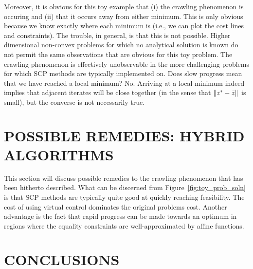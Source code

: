 \documentclass[letterpaper, 10 pt, conference]{ieeeconf}
\begin{document}
Moreover, it is obvious for this toy example that (i) the crawling phenomenon is occuring and (ii) that it occurs away from either minimum. This is only obvious because we know exactly where each minimum is (i.e., we can plot the cost lines and constraints). The trouble, in general, is that this is not possible. Higher dimensional non-convex problems for which no analytical solution is known do not permit the same observations that are obvious for this toy problem. The crawling phenomenon is effectively unobservable in the more challenging problems for which SCP methods are typically implemented on. Does slow progress mean that we have reached a local minimum? No. Arriving at a local minimum indeed implies that adjacent iterates will be close together (in the sense that $\|z^*-\bar{z}\|$ is small), but the converse is not necessarily true. 


\section{POSSIBLE REMEDIES: HYBRID ALGORITHMS}

This section will discuss possible remedies to the crawling phenomenon that has been hitherto described. What can be discerned from Figure~\ref{fig:toy_prob_soln} is that SCP methods are typically quite good at quickly reaching feasibility. The cost of using virtual control dominates the original problems cost. Another advantage is the fact that rapid progress can be made towards an optimum in regions where the equality constraints are well-approximated by affine functions.


\section{CONCLUSIONS}


\end{document}

